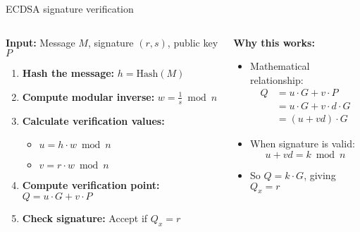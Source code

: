 \documentclass[aspectratio=169, lualatex, handout]{beamer}
\begin{document}
\begin{frame}{ECDSA signature verification}
	\begin{columns}
		\begin{column}{0.6\textwidth}
			\textbf{Input:} Message $M$, signature $(r, s)$, public key $P$
			\begin{enumerate}[<+->]
				\item \textbf{Hash the message:} $h = \text{Hash}(M)$
				\item \textbf{Compute modular inverse:} $w = \frac{1}{s} \bmod n$
				\item \textbf{Calculate verification values:}
				      \begin{itemize}
					      \item $u = h \cdot w \bmod n$
					      \item $v = r \cdot w \bmod n$
				      \end{itemize}
				\item \textbf{Compute verification point:} $Q = u \cdot G + v \cdot P$
				\item \textbf{Check signature:} Accept if $Q_x = r$
			\end{enumerate}
		\end{column}
		\begin{column}{0.4\textwidth}
			\textbf{Why this works:}
			\begin{itemize}[<+->]
				\item Mathematical relationship:
				      \begin{align*}
					      Q & = u \cdot G + v \cdot P         \\
					        & = u \cdot G + v \cdot d \cdot G \\
					        & = (u + vd) \cdot G
				      \end{align*}
				\item When signature is valid:
				      $$u + vd = k \bmod n$$
				\item So $Q = k \cdot G$, giving $Q_x = r$
			\end{itemize}
		\end{column}
	\end{columns}
\end{frame}
\end{document}
